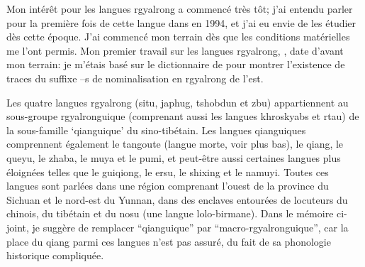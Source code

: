 \documentclass[oldfontcommands,oneside,a4paper,11pt]{memoir}
\begin{document}
\begin{newicktree}
  \small \label{fig:stammbaum}
  \setunitlength{15cm} \righttree \nobranchlengths \nodelabelformat{}
  \par %
\end{newicktree}


Mon intérêt pour les langues rgyalrong a commencé très tôt; j'ai entendu parler pour la première fois de cette langue dans \citet{delancey87st} en 1994, et j'ai eu envie de les étudier   dès cette époque. J'ai commencé mon terrain dès que les conditions matérielles me l'ont permis. Mon premier travail sur les langues rgyalrong, \citet{jacques03s.houzhui}, date d'avant mon terrain: je m'étais basé sur le dictionnaire de \citet{huangsun02} pour montrer l'existence de traces du suffixe --s de nominalisation en rgyalrong de l'est.



Les quatre langues rgyalrong (situ, japhug, tshobdun et zbu) appartiennent au sous-groupe rgyalronguique (comprenant aussi les langues khroskyabs et rtau) de la sous-famille `qianguique' du sino-tibétain. Les langues qianguiques comprennent également le tangoute (langue morte, voir plus bas), le qiang, le queyu, le zhaba, le muya et le pumi, et peut-être aussi certaines langues plus éloignées telles que le guiqiong, le ersu, le shixing et le namuyi. Toutes ces langues sont parlées dans une région comprenant l’ouest de la province du Sichuan et le nord-est du Yunnan, dans des enclaves entourées de locuteurs du chinois, du tibétain et du nosu (une langue lolo-birmane). Dans le mémoire ci-joint, je suggère de remplacer ``qianguique'' par ``macro-rgyalronguique'', car la place du qiang parmi ces langues n'est pas assuré, du fait de sa phonologie historique compliquée.
\end{document}
